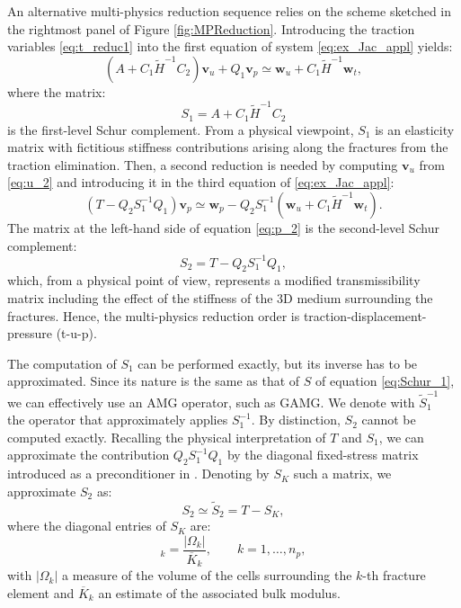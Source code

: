 \documentclass[3p,times]{elsarticle}
\theoremstyle{plain}
\newcommand{\tS}{\widetilde{S}}
\newcommand{\tH}{\widetilde{H}}
\begin{document}
An alternative multi-physics reduction sequence relies on the scheme sketched in the rightmost panel of Figure \ref{fig:MPReduction}. Introducing the traction variables \eqref{eq:t_reduc1} into the first equation of system \eqref{eq:ex_Jac_appl} yields:
\begin{equation}
    \left( A + C_1 \tH^{-1} C_2 \right) \mathbf{v}_u + Q_1 \mathbf{v}_p \simeq \mathbf{w}_u + C_1 \tH^{-1} \mathbf{w}_t,
    \label{eq:u_2}
\end{equation}
where the matrix:
\begin{equation}
    S_1 = A + C_1 \tH^{-1} C_2
    \label{eq:Schur1_2}
\end{equation}
is the first-level Schur complement. From a physical viewpoint, $S_1$ is an elasticity matrix with fictitious stiffness contributions arising along the fractures from the traction elimination. Then, a second reduction is needed by computing $\mathbf{v}_u$ from \eqref{eq:u_2} and introducing it in the third equation of \eqref{eq:ex_Jac_appl}:
\begin{equation}
    \left( T - Q_2 S_1^{-1} Q_1 \right) \mathbf{v}_p \simeq \mathbf{w}_p - Q_2 S_1^{-1} \left( \mathbf{w}_u + C_1 \tH^{-1} \mathbf{w}_t \right).
    \label{eq:p_2}
\end{equation}
The matrix at the left-hand side of equation \eqref{eq:p_2} is the second-level Schur complement:
\begin{equation}
    S_2 = T - Q_2 S_1^{-1} Q_1,
    \label{eq:Schur2_2}
\end{equation}
which, from a physical point of view, represents a modified transmissibility matrix including the effect of the stiffness of the 3D medium surrounding the fractures. Hence, the multi-physics reduction order is traction-displacement-pressure (t-u-p).

The computation of $S_1$ can be performed exactly, but its inverse has to be approximated. Since its nature is the same as that of $S$ of equation \eqref{eq:Schur_1}, we can effectively use an AMG operator, such as GAMG. We denote with $\tS_1^{-1}$ the operator that approximately applies $S_1^{-1}$. By distinction, $S_2$ cannot be computed exactly. Recalling the physical interpretation of $T$ and $S_1$, we can approximate the contribution $Q_2 S_1^{-1} Q_1$ by the diagonal fixed-stress matrix introduced as a preconditioner in \cite{whicastch16,caswhifer16}. Denoting by $S_K$ such a matrix, we approximate $S_2$ as:
\begin{equation}
    S_2 \simeq \tS_2 = T - S_K,
    \label{eq:app_Schur2_2}
\end{equation}
where the diagonal entries of $S_K$ are:
\begin{equation}
    [S_K]_k = \frac{|\Omega_k|}{\overline{K}_k}, \qquad k=1,\ldots,n_p,
    \label{eq:FS}
\end{equation}
with $|\Omega_k|$ a measure of the volume of the cells surrounding the $k$-th fracture element and $\overline{K}_k$ an estimate of the associated bulk modulus.
\end{document}
